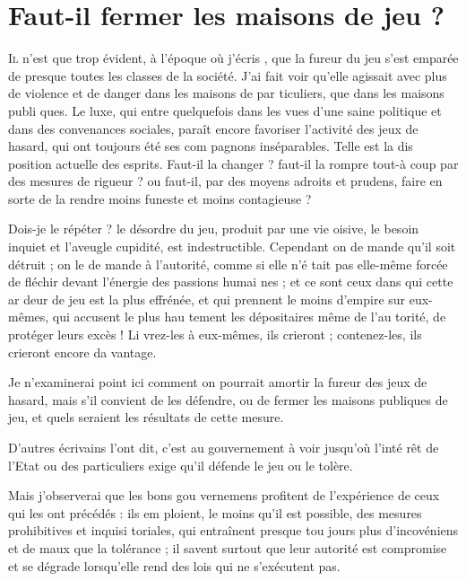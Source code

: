 \chapter{Faut-il fermer les maisons de jeu ?}

\lettrine{I}{l} n'est que trop évident, à l'époque
où j'écris \notemark, que la fureur du jeu
s'est emparée de presque toutes les
classes de la société. J'ai fait voir
qu'elle agissait avec plus de violence
et de danger dans les maisons de par%
ticuliers, que dans les maisons publi%
ques. Le luxe, qui entre quelquefois
dans les vues d'une saine politique et
dans des convenances sociales, paraît
encore favoriser l'activité des jeux de
hasard, qui ont toujours été ses com%
pagnons inséparables. Telle est la dis%
position actuelle des esprits. Faut-il
la changer ? faut-il la rompre tout-à
coup par des mesures de rigueur ? ou
faut-il, par des moyens adroits et
prudens, faire en sorte de la rendre
moins funeste et moins contagieuse ?

Dois-je le répéter ? le désordre du
jeu, produit par une vie oisive, le
besoin inquiet et l'aveugle cupidité,
est indestructible. Cependant on de%
mande qu'il soit détruit ; on le de%
mande à l'autorité, comme si elle n'é%
tait pas elle-même forcée de fléchir
devant l'énergie des passions humai%
nes ; et ce sont ceux dans qui cette ar%
deur de jeu est la plus effrénée, et
qui prennent le moins d'empire sur
eux-mêmes, qui accusent le plus hau%
tement les dépositaires même de l'au%
torité, de protéger leurs excès ! Li%
vrez-les à eux-mêmes, ils crieront ;
contenez-les, ils crieront encore da%
vantage.

Je n'examinerai point ici comment
on pourrait amortir la fureur des
jeux de hasard, mais s'il convient de
les défendre, ou de fermer les maisons
publiques de jeu, et quels seraient les
résultats de cette mesure.

D'autres écrivains l'ont dit, c'est au
gouvernement à voir jusqu'où l'inté%
rêt de l'Etat ou des particuliers exige
qu'il défende le jeu ou le tolère.

Mais j'observerai que les bons gou%
vernemens profitent de l'expérience
de ceux qui les ont précédés : ils em%
ploient, le moins qu'il est possible,
des mesures prohibitives et inquisi%
toriales, qui entraînent presque tou%
jours plus d'incovéniens et de maux
que la tolérance ; il savent surtout
que leur autorité est compromise et se
dégrade lorsqu'elle rend des lois qui 
ne s'exécutent pas.

